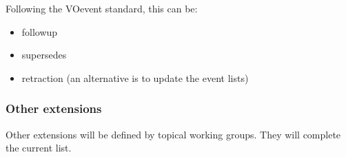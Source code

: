 \documentclass[11pt,a4paper]{ivoa}
\begin{document}
Following the VOevent standard, this can be:

\begin{itemize}
\item followup
\item supersedes
\item retraction (an alternative is to update the event lists)
\end{itemize}


\subsubsection{Other extensions}

Other extensions will be defined by topical working groups. They will complete the current list.



\end{document}
